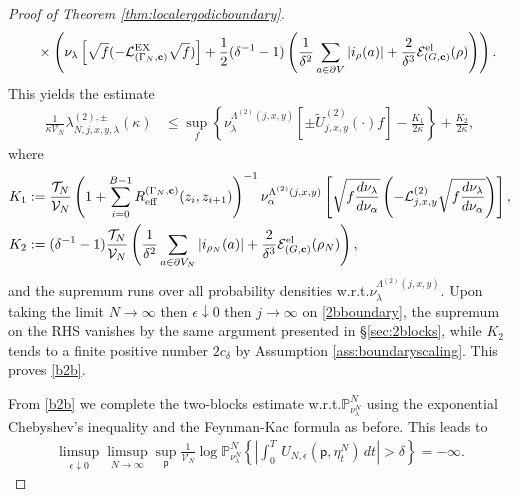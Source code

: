 \documentclass[11pt]{amsart}
\theoremstyle{plain}
\theoremstyle{definition}
\theoremstyle{remark}
\begin{document}
\begin{proof}[Proof of Theorem \ref{thm:localergodicboundary}]
\begin{align*}
 & \qquad \times\left( \nu_\lambda\left[\sqrt{f}(-\mathcal{L}^{\rm EX}_{(\Gamma_N,{\bf c})} \sqrt{f})\right] +\frac{1}{2}(\delta^{-1}-1)\left(\frac{1}{\delta^2} \sum_{a\in \partial V} |i_\rho(a)| + \frac{2}{\delta^3} \mathcal{E}^{\rm el}_{(G,{\bf c})} (\rho) \right)\right).
\end{align*}
This yields the estimate
\begin{align}
\label{2bboundary}
\frac{1}{\kappa \mathcal{V}_N}\lambda^{(2),\pm}_{N,j,x,y,\lambda}(\kappa) & \leq \sup_f\left\{\nu^{\Lambda^{(2)}(j,x,y)}_\lambda\left[\pm \tilde{U}^{(2)}_{j,x,y}(\cdot)f\right]-\frac{K_1}{2\kappa} \right\} + \frac{K_2}{2\kappa},
\end{align}
where
\begin{align*}
K_1 &:= \frac{\mathcal{T}_N}{\mathcal{V}_N}\left(1+ \sum_{i=0}^{B-1} R_{\rm eff}^{(\Gamma_N, {\bf c})}(z_i, z_{i+1})\right)^{-1}\nu_\alpha^{\Lambda^{(2)}(j,x,y)}\left[\sqrt{f\frac{d\nu_\lambda}{d\nu_\alpha}}\left(-\mathcal{L}^{(2)}_{j,x,y} \sqrt{f\frac{d\nu_\lambda}{d\nu_\alpha}}\right)\right] ,\\
K_2 &:= (\delta^{-1}-1)\frac{\mathcal{T}_N}{\mathcal{V}_N}\left(\frac{1}{\delta^2} \sum_{a\in \partial V_N} |i_{\rho_N}(a)| + \frac{2}{\delta^3} \mathcal{E}^{\rm el}_{(G,{\bf c})} (\rho_N)\right),
\end{align*}
and the supremum runs over all probability densities w.r.t.\@ $\nu_\lambda^{\Lambda^{(2)}(j,x,y)}$.
Upon taking the limit $N\to\infty$ then $\epsilon\downarrow 0$ then $j\to\infty$ on \eqref{2bboundary}, the supremum on the RHS vanishes by the same argument presented in \S\ref{sec:2blocks}, while $K_2$ tends to a finite positive number $2 c_{\delta}$ by  Assumption \ref{ass:boundaryscaling}. This proves \eqref{b2b}.

From \eqref{b2b} we complete the two-blocks estimate w.r.t.\@ $\mathbb{P}^N_{\nu_\lambda^N}$ using the exponential Chebyshev's inequality and the Feynman-Kac formula as before. This leads to
\begin{align}
\label{bdsup}
\limsup_{\epsilon\downarrow 0} \limsup_{N\to\infty} \sup_{\mathsf{p}} \frac{1}{\mathcal{V}_N} \log \mathbb{P}^N_{\nu^N_\lambda} \left\{ \left|\int_0^T\, U_{N,\epsilon}({\mathsf{p}},\eta^N_t)\,dt\right|>\delta\right\} = -\infty.
\end{align}


\end{proof}
\end{document}
